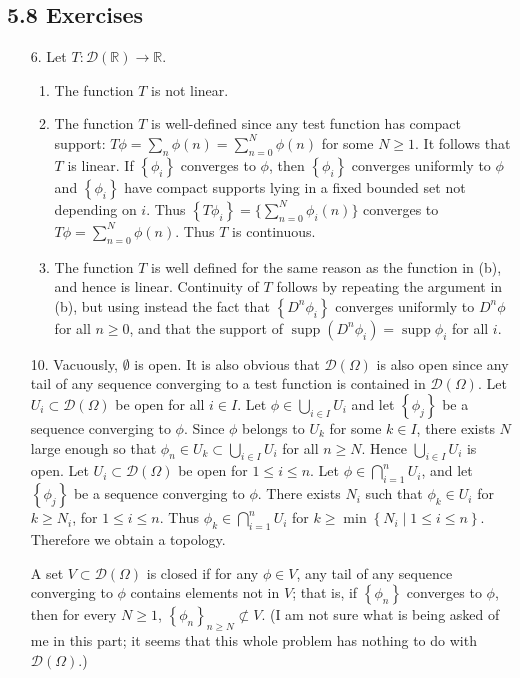 \documentclass[11pt,leqno]{article}
\theoremstyle{plain}
\theoremstyle{definition}
\numberwithin{equation}{section}
\numberwithin{lem}{section}
\newcommand{\cbr}[1]{\left\{#1\right\}}
\DeclareMathOperator{\supp}{supp}
\begin{document}
\subsection*{5.8 Exercises}
\begin{enumerate}
    \item[6.] Let $T\colon\mathcal D(\mathbb R)\to \mathbb R$.
    \begin{enumerate}
      \item The function $T$ is not linear.
      \item The function $T$ is well-defined since any test function has compact support: $T\phi = \sum_n\phi(n) = \sum_{n=0}^N\phi(n)$ for some $N\geq 1$. It follows that $T$ is linear. If $\cbr{\phi_i}$ converges to $\phi$, then $\cbr{\phi_i}$ converges uniformly to $\phi$ and $\cbr{\phi_i}$ have compact supports lying in a fixed bounded set not depending on $i$. Thus $\cbr{T\phi_i} = \big\{\sum_{n=0}^N\phi_i(n)\big\}$ converges to $T\phi = \sum_{n=0}^N\phi(n)$. Thus $T$ is continuous.
      \item The function $T$ is well defined for the same reason as the function in (b), and hence is linear. Continuity of $T$ follows by repeating the argument in (b), but using instead the fact that $\cbr{D^n\phi_i}$ converges uniformly to $D^n\phi$ for all $n\geq 0$, and that the support of $\supp(D^n\phi_i)=\supp{\phi_i}$ for all $i$.
    \end{enumerate}
    \item[10.] Vacuously, $\emptyset$ is open. It is also obvious that $\mathcal D(\Omega)$ is also open since any tail of any sequence converging to a test function is contained in $\mathcal D(\Omega)$. Let $U_i\subset \mathcal D(\Omega)$ be open for all $i\in I$. Let $\phi\in \bigcup_{i\in I}U_i$ and let $\cbr{\phi_j}$ be a sequence converging to $\phi$. Since $\phi$ belongs to $U_k$ for some $k\in I$, there exists $N$ large enough so that $\phi_n\in U_k\subset \bigcup_{i\in I}U_i$ for all $n\geq N$. Hence $\bigcup_{i\in I}U_i$ is open. Let $U_i\subset \mathcal D(\Omega)$ be open for $1\leq i\leq n$. Let $\phi\in \bigcap_{i=1}^nU_i$, and let $\cbr{\phi_j}$ be a sequence converging to $\phi$. There exists $N_i$ such that $\phi_k\in U_i$ for $k\geq N_i$, for $1\leq i\leq n$. Thus $\phi_k\in \bigcap_{i=1}^nU_i$ for $k\geq \min\cbr{N_i\mid 1\leq i\leq n}$. Therefore we obtain a topology.
    
    A set $V\subset \mathcal D(\Omega)$ is closed if for any $\phi\in V$, any tail of any sequence converging to $\phi$ contains elements not in $V$; that is, if $\cbr{\phi_n}$ converges to $\phi$, then for every $N\geq 1$, $\cbr{\phi_n}_{n\geq N}\not\subset V$. (I am not sure what is being asked of me in this part; it seems that this whole problem has nothing to do with $\mathcal D(\Omega)$.)


\end{enumerate}
\end{document}
